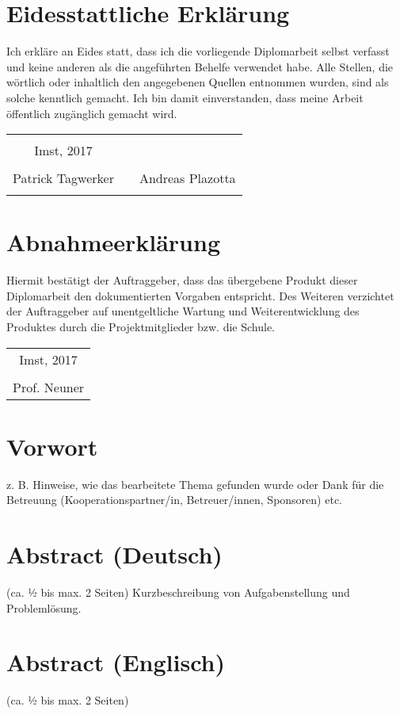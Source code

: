 \chapter*{Eidesstattliche Erklärung}
Ich erkläre an Eides statt, dass ich die vorliegende Diplomarbeit selbst verfasst und keine anderen als die angeführten Behelfe verwendet habe. Alle Stellen, die wörtlich oder inhaltlich den angegebenen Quellen entnommen wurden, sind als solche kenntlich gemacht.
Ich bin damit einverstanden, dass meine Arbeit öffentlich zugänglich gemacht wird.

\vspace{1cm}
\begin{tabular}{c c c}
	& \hspace{4cm} & \\\cline{1-1}
	Imst, 2017 & & \\
	\vspace{2cm}
	& & \\\cline{1-1}\cline{3-3}
	Patrick Tagwerker & & Andreas Plazotta \\ 
	\vspace{2cm}
	\\ 
\end{tabular}

\chapter*{Abnahmeerklärung}
Hiermit bestätigt der Auftraggeber, dass das übergebene Produkt dieser Diplomarbeit den dokumentierten Vorgaben entspricht. Des Weiteren verzichtet der Auftraggeber auf unentgeltliche Wartung und Weiterentwicklung des Produktes durch die Projektmitglieder bzw. die Schule.

\vspace{1cm}
\begin{tabular}{c}
	\\\cline{1-1}
	Imst, 2017\\
	\vspace{2cm}
	\\\cline{1-1}
	Prof. Neuner
\end{tabular}	

\chapter*{Vorwort}
z. B. Hinweise, wie das bearbeitete Thema gefunden wurde oder Dank für die Betreuung (Kooperationspartner/in, Betreuer/innen, Sponsoren) etc.


\chapter*{Abstract (Deutsch)}
(ca. ½ bis max. 2 Seiten)
Kurzbeschreibung von Aufgabenstellung und Problemlösung.

\chapter*{Abstract (Englisch)}
(ca. ½ bis max. 2 Seiten)